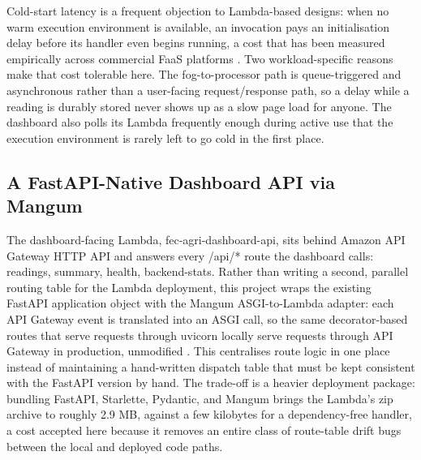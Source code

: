\documentclass[conference]{IEEEtran}
\begin{document}
Cold-start latency is a frequent objection to Lambda-based designs: when no warm execution environment is available, an invocation pays an initialisation delay before its handler even begins running, a cost that has been measured empirically across commercial FaaS platforms \cite{ref8}. Two workload-specific reasons make that cost tolerable here. The fog-to-processor path is queue-triggered and asynchronous rather than a user-facing request/response path, so a delay while a reading is durably stored never shows up as a slow page load for anyone. The dashboard also polls its Lambda frequently enough during active use that the execution environment is rarely left to go cold in the first place.

\subsection{A FastAPI-Native Dashboard API via Mangum}
The dashboard-facing Lambda, fec-agri-dashboard-api, sits behind Amazon API Gateway HTTP API and answers every /api/* route the dashboard calls: readings, summary, health, backend-stats. Rather than writing a second, parallel routing table for the Lambda deployment, this project wraps the existing FastAPI application object with the Mangum ASGI-to-Lambda adapter: each API Gateway event is translated into an ASGI call, so the same decorator-based routes that serve requests through uvicorn locally serve requests through API Gateway in production, unmodified \cite{ref9}. This centralises route logic in one place instead of maintaining a hand-written dispatch table that must be kept consistent with the FastAPI version by hand. The trade-off is a heavier deployment package: bundling FastAPI, Starlette, Pydantic, and Mangum brings the Lambda's zip archive to roughly 2.9 MB, against a few kilobytes for a dependency-free handler, a cost accepted here because it removes an entire class of route-table drift bugs between the local and deployed code paths.
\end{document}
